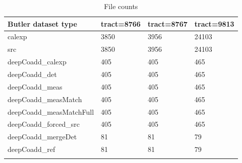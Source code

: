 \begin{longtable}{llll} \label{tab:count}
Butler dataset type & tract=8766 & tract=8767 & tract=9813\\
\hline
calexp & 3850 & 3956 & 24103 \\  
src    & 3850 & 3956 & 24103 \\
deepCoadd{\_}calexp        & 405 & 405 & 465 \\
deepCoadd{\_}det           & 405 & 405 & 465 \\ 
deepCoadd{\_}meas          & 405 & 405 & 465 \\ 
deepCoadd{\_}measMatch     & 405 & 405 & 465 \\ 
deepCoadd{\_}measMatchFull & 405 & 405 & 465 \\ 
deepCoadd{\_}forced{\_}src & 405 & 405 & 465 \\ 
deepCoadd{\_}mergeDet      & 81 & 81 & 79 \\ 
deepCoadd{\_}ref           & 81 & 81 & 79 \\ 
\caption{File counts}
\end{longtable}

